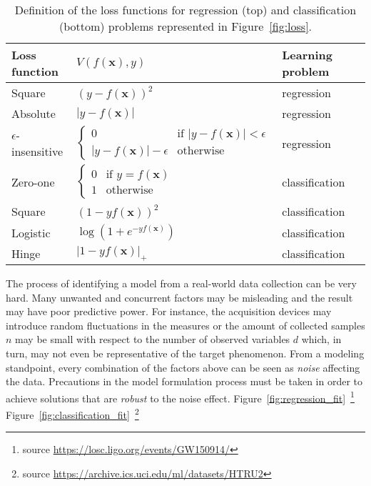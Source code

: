     \begin{table}[!h]
    	\centering
    	\caption{Definition of the loss functions for regression (top) and classification (bottom) problems represented in Figure~\ref{fig:loss}.}\label{tab:losses}
    	\begin{tabular}{@{}ll@{}ll@{}}
    		\toprule
    		Loss function & $V(f(\bm{x}),y)$  & Learning problem           \\ \midrule
    		Square                   & $(y - f(\bm{x}))^2$ & regression \\
    		Absolute                 & $|y - f(\bm{x})|$ & regression   \\
    		$\epsilon$-insensitive   & $\begin{cases}
    		0 & \text{if } |y-f(\bm{x})| < \epsilon\\
    		|y-f(\bm{x})| - \epsilon & \text{otherwise}
    		\end{cases} $        & regression                 \\
    		\midrule
    		Zero-one               & $\begin{cases}
    		0 & \text{if } y = f(\bm{x})\\
    		1 & \text{otherwise}
    		\end{cases}$ & classification \\
    		Square                 & $(1 - yf(\bm{x}))^2$ & classification  \\
    		Logistic                 & $\log(1 + e^{-yf(\bm{x})})$ & classification  \\
    		Hinge                 & $|1 - yf(\bm{x})|_+$ & classification  \\
    		\bottomrule
    	\end{tabular}
    \end{table}

    The process of identifying a model from a real-world data collection can be very hard. Many unwanted and concurrent factors may be misleading and the result may have poor predictive power. For instance, the acquisition devices may introduce random fluctuations in the measures or the amount of collected samples $n$ may be small with respect to the number of observed variables $d$ which, in turn, may not even be representative of the target phenomenon. From a modeling standpoint, every combination of the factors above can be seen as \textit{noise} affecting the data. Precautions in the model formulation process must be taken in order to achieve solutions that are \textit{robust} to the noise effect. 
    Figure~\ref{fig:regression_fit}~\footnote{source \url{https://losc.ligo.org/events/GW150914/}}
    Figure~\ref{fig:classification_fit}~\footnote{source \url{https://archive.ics.uci.edu/ml/datasets/HTRU2}}

